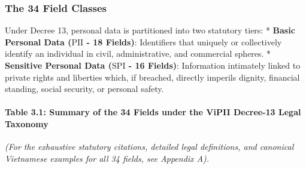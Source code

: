 \documentclass[
]{article}
\begin{document}
\subsubsection{The 34 Field Classes}\label{the-34-field-classes}

Under Decree 13, personal data is partitioned into two statutory tiers:
* \textbf{Basic Personal Data (\(\text{PII}\) - 18 Fields)}: Identifiers
that uniquely or collectively identify an individual in civil,
administrative, and commercial spheres. * \textbf{Sensitive Personal
Data (\(\text{SPI}\) - 16 Fields)}: Information intimately linked to
private rights and liberties which, if breached, directly imperils
dignity, financial standing, social security, or personal safety.

\paragraph{Table 3.1: Summary of the 34 Fields under the ViPII Decree-13
Legal
Taxonomy}\label{table-3.1-summary-of-the-34-fields-under-the-vipii-decree-13-legal-taxonomy}

\emph{(For the exhaustive statutory citations, detailed legal
definitions, and canonical Vietnamese examples for all 34 fields, see
Appendix A).}
\end{document}
